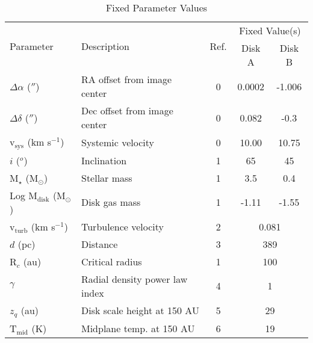 \begin{table}[h!]
  \begin{threeparttable}
    \centering
    \caption{Fixed Parameter Values}
    \label{table:fixed_params}
    \renewcommand{\arraystretch}{1.2}
    \begin{tabular}{l  l  c  c  c }
      \toprule \toprule
      \multirow{2}{*}{Parameter} & \multirow{2}{*}{Description} & \multirow{2}{*}{Ref.} & \multicolumn{2}{c}{Fixed Value(s)} \\
                                 &                              &                         & Disk A & Disk B \\
      \midrule %
      $\Delta \alpha$ ($''$)       &  RA offset from image center     & 0  & 0.0002 & -1.006  \\
      $\Delta \delta$ ($''$)       &  Dec offset from image center    & 0  & 0.082  & -0.3    \\
      v$_\text{sys}$ (km s$^{-1}$) &  Systemic velocity               & 0  & 10.00  & 10.75   \\
      $i$ ($^o$)                   &  Inclination                     & 1  & 65     & 45      \\
      M$_\star$ (M$_\odot$)        &  Stellar mass                    & 1  & 3.5    & 0.4     \\
      Log M$_\text{disk}$ (M$_\odot$) & Disk gas mass\tnote{*}        & 1  & -1.11  & -1.55   \\
      v$_\text{turb}$ (km s$^{-1}$) &  Turbulence velocity            & 2  & \multicolumn{2}{c}{0.081}   \\
      $d$ (pc)                     &  Distance                        & 3  & \multicolumn{2}{c}{389}   \\
      R$_c$ (au)                   &  Critical radius                 & 1  & \multicolumn{2}{c}{100}\\
      $\gamma$                     &  Radial density power law index  & 4  & \multicolumn{2}{c}{1}\\
      $z_q$ (au)                   &  Disk scale height at 150 AU     & 5  & \multicolumn{2}{c}{29}\\
      T$_\text{mid}$ (K)           &  Midplane temp. at 150 AU        & 6  & \multicolumn{2}{c}{19}\\
      \bottomrule
    \end{tabular}


\end{threeparttable}
\end{table}
